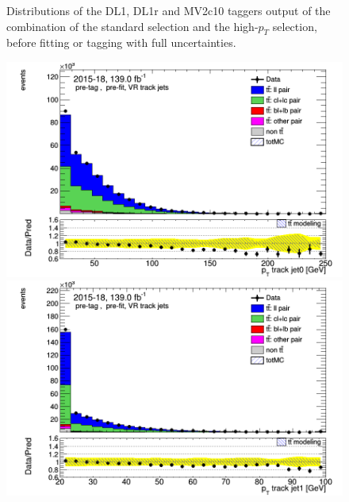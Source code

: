 \documentclass[letterpaper,12pt]{article}
\begin{document}
\begin{figure}[h]
\begin{minipage}[b]{.45\textwidth}
\end{minipage}
\caption{Distributions of the DL1, DL1r and MV2c10 taggers output of the combination of the standard selection and the high-$p_T$ selection, before fitting or tagging with full uncertainties.} \label{fig:taggers_VRJets}
\end{figure}


\begin{figure}
\begin{minipage}[b]{.45\textwidth}
\centering
\includegraphics[width=1\textwidth]{Oct_distributions/pretagNoRwDL1rwithhighpTVRJets_scaledall/DataMC_J0_pt.png}
\end{minipage}\hfill
\begin{minipage}[b]{.45\textwidth}
\centering
\includegraphics[width=1\textwidth]{Oct_distributions/pretagNoRwDL1rwithhighpTVRJets_scaledall/DataMC_J1_pt.png}
\end{minipage}\hfill
\begin{minipage}[b]{.45\textwidth}

\end{minipage}
\end{figure}
\end{document}
